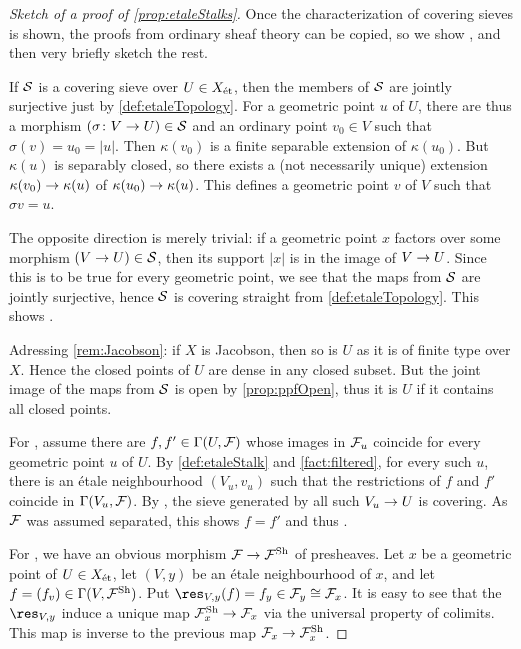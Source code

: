 \documentclass[a4paper, 10pt, oneside, DIV=9, chapterprefix=true, numbers=enddot, bibliography=totoc]{scrbook}
\begin{document}
\begin{proof}[Sketch of a proof of \cref{prop:etaleStalks}]
	Once the characterization of covering sieves is shown, the proofs from ordinary sheaf theory can be copied, so we show , and then very briefly sketch the rest.
	
	If $\mathcal{S}$ is a covering sieve over $U\in X_{\mathrm{\acute{e}t}}$, then the members of $\mathcal{S}$ are jointly surjective just by \cref{def:etaleTopology}. For a geometric point $u$ of $U$, there are thus a morphism $(\sigma\colon V\morphism U)\in\Ss$ and an ordinary point $v_0\in V$ such that $\sigma(v)=u_0=|u|$. Then $\kappa(v_0)$ is a finite separable extension of $\kappa(u_0)$. But $\kappa(u)$ is separably closed, so there exists a (not necessarily unique) extension $\kappa(v_0)\morphism \kappa(u)$ of $\kappa(u_0)\morphism \kappa(u)$. This defines a geometric point $v$ of $V$ such that $\sigma v=u$.
	
	The opposite direction is merely trivial: if a geometric point $x$ factors over some morphism $(V\morphism U)\in \Ss$, then its support $|x|$ is in the image of $V\morphism U$. Since this is to be true for every geometric point, we see that the maps from $\mathcal{S}$ are jointly surjective, hence $\mathcal{S}$ is covering straight from \cref{def:etaleTopology}. This shows .
	
	Adressing \cref{rem:Jacobson}: if $X$ is Jacobson, then so is $U$ as it is of finite type over $X$. Hence the closed points of $U$ are dense in any closed subset. But the joint image of the maps from $\mathcal{S}$ is open by \cref{prop:ppfOpen}, thus it is $U$ if it contains all closed points.
	
	For , assume there are $f,f'\in\operatorname{\Gamma}(U,\mathcal{F})$ whose images in $\mathcal{F}_u$ coincide for every geometric point $u$ of $U$. By \cref{def:etaleStalk} and \cref{fact:filtered}, for every such $u$, there is an étale neighbourhood $(V_u,v_u)$ such that the restrictions of $f$ and $f'$ coincide in $\operatorname{\Gamma}(V_u,\mathcal{F})$. By , the sieve generated by all such $V_u\morphism U$ is covering. As $\mathcal{F}$ was assumed separated, this shows $f=f'$ and thus .
	
	For , we have an obvious morphism $\Ff\morphism\Ff^\Sh$ of presheaves. Let $x$ be a geometric point of $U\in X_{\mathrm{\acute{e}t}}$, let $(V,y)$ be an étale neighbourhood of $x$, and let $f=(f_v)\in\operatorname{\Gamma}(V,\mathcal{F}^{\mathrm{Sh}})$. Put $\res_{V,y}(f)=f_y\in\Ff_y\cong \Ff_x$. It is easy to see that the $\res_{V,y}$ induce a unique map $\Ff_x^\Sh\morphism \Ff_x$ via the universal property of colimits. This map is inverse to the previous map $\Ff_x\morphism\Ff_x^\Sh$.
	

\end{proof}
\end{document}
